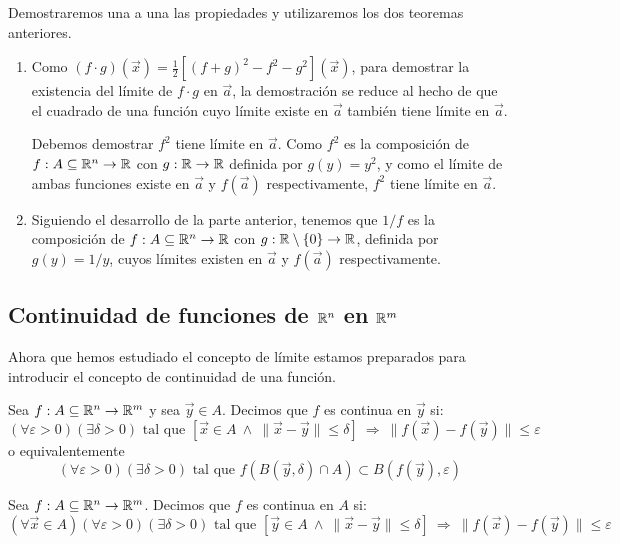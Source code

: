 \begin{demostracion}
Demostraremos una a una las propiedades y utilizaremos los dos teoremas anteriores. 
\begin{enumerate}
\item Como $(f\cdot g)(\vec{x}) = \frac{1}{2}[(f+g)^2-f^2-g^2](\vec{x})$, para demostrar la existencia del l\'imite de $f\cdot g$ en $\vec{a}$, la demostraci\'on se reduce al hecho de que el cuadrado de una funci\'on cuyo l\'imite existe en $\vec{a}$ tambi\'en tiene l\'imite en $\vec{a}$. 

Debemos demostrar $f^2$ tiene l\'imite en $\vec{a}$. Como $f^2$ es la composici\'on de $f:A\subseteq \mathbb{R}^n \to \mathbb{R}$ con $g: \mathbb{R} \to \mathbb{R}$ definida por $g(y)=y^2$, y como el l\'imite de ambas funciones existe en $\vec{a}$ y $f(\vec{a})$ respectivamente, $f^2$ tiene l\'imite en $\vec{a}$.

\item Siguiendo el desarrollo de la parte anterior, tenemos que $1/f$ es la composici\'on de $f:A\subseteq \mathbb{R}^n \to \mathbb{R}$ con $g:\mathbb{R}\setminus \{0\} \to \mathbb{R}$, definida por $g(y)=1/y$, cuyos l\'imites existen en $\vec{a}$ y $f(\vec{a})$ respectivamente.
\end{enumerate}
\end{demostracion}

\subsection{Continuidad de funciones de \texorpdfstring{$\mathbb{R}^n$}{Rn} en \texorpdfstring{$\mathbb{R}^m$}{Rm}}
Ahora que hemos estudiado el concepto de l\'imite estamos 
preparados para introducir el concepto de continuidad de una funci\'on.

\begin{definicion} Sea $f:A\subseteq\mathbb{R}^n\to\mathbb{R}^m$ y sea $\vec{y}\in A$. 
Decimos que $f$ es continua en $\vec{y}$ si:
$$(\forall\varepsilon>0)(\exists\delta>0) \text{ tal que } [\vec{x}\in A \:\wedge \: \|\vec{x}-\vec{y}\|\leq \delta] \:\Rightarrow\: \|f(\vec{x})-f(\vec{y})\|\leq \varepsilon$$
o equivalentemente
$$(\forall\varepsilon>0)(\exists\delta>0) \text{ tal que } f(B(\vec{y},\delta)\cap A)\subset B(f(\vec{y}),\varepsilon)
$$
\end{definicion}

\begin{definicion} Sea $f:A\subseteq\mathbb{R}^n\to\mathbb{R}^m$. Decimos que $f$ es continua en $A$ si:
$$(\forall \vec{x}\in A)(\forall\varepsilon>0)(\exists\delta>0) \text{ tal que } [\vec{y} \in A \:\wedge \: \|\vec{x}-\vec{y} \|\leq \delta] \:\Rightarrow\: \|f(\vec{x})-f(\vec{y})\|\leq \varepsilon$$
\end{definicion}

